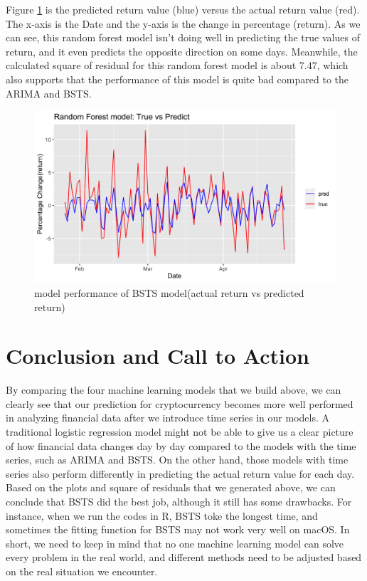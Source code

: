 \documentclass{article}
\begin{document}
\noindent Figure \ref{fig: rf1_true_and_predict} is the predicted return value (blue) versus the actual return value (red). The x-axis is the Date and the y-axis is the change in percentage (return). As we can see, this random forest model isn't doing well in predicting the true values of return, and it even predicts the opposite direction on some days. Meanwhile, the calculated square of residual for this random forest model is about 7.47, which also supports that the performance of this model is quite bad compared to the ARIMA and BSTS. 

\begin{figure}[H]
	\centering
	\includegraphics[width=16cm]{../figures/rf1_true_and_predict.png}
	\caption{model performance of BSTS model(actual return vs predicted return)}
	\label{fig: rf1_true_and_predict}
\end{figure}

\section{Conclusion and Call to Action}

By comparing the four machine learning models that we build above, we can clearly see that our prediction for cryptocurrency becomes more well performed in analyzing financial data after we introduce time series in our models. A traditional logistic regression model might not be able to give us a clear picture of how financial data changes day by day compared to the models with the time series, such as ARIMA and BSTS. On the other hand, those models with time series also perform differently in predicting the actual return value for each day. Based on the plots and square of residuals that we generated above, we can conclude that BSTS did the best job, although it still has some drawbacks. For instance, when we run the codes in R, BSTS toke the longest time, and sometimes the fitting function for BSTS  may not work very well on macOS. In short, we need to keep in mind that no one machine learning model can solve every problem in the real world, and different methods need to be adjusted based on the real situation we encounter. 
\end{document}
